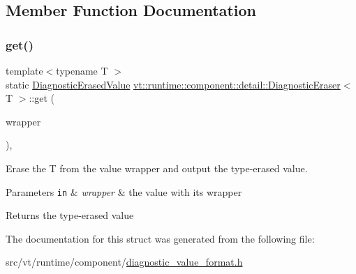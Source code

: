 \subsection{Member Function Documentation}
\mbox{\label{structvt_1_1runtime_1_1component_1_1detail_1_1_diagnostic_eraser_af09e0632083615511f10dd65b06e4781}} 
\subsubsection{\texorpdfstring{get()}{get()}}
{\footnotesize\ttfamily template$<$typename T $>$ \\
static \hyperlink{structvt_1_1runtime_1_1component_1_1_diagnostic_erased_value}{Diagnostic\+Erased\+Value} \hyperlink{structvt_1_1runtime_1_1component_1_1detail_1_1_diagnostic_eraser}{vt\+::runtime\+::component\+::detail\+::\+Diagnostic\+Eraser}$<$ T $>$\+::get (\begin{DoxyParamCaption}\item[{\hyperlink{structvt_1_1runtime_1_1component_1_1detail_1_1_diagnostic_value_wrapper}{Diagnostic\+Value\+Wrapper}$<$ T $>$}]{wrapper }\end{DoxyParamCaption})\hspace{0.3cm}{\ttfamily [inline]}, {\ttfamily [static]}}



Erase the {\ttfamily T} from the value wrapper and output the type-\/erased value. 


\begin{DoxyParams}[1]{Parameters}
\mbox{\tt in}  & {\em wrapper} & the value with its wrapper\\
\hline
\end{DoxyParams}
\begin{DoxyReturn}{Returns}
the type-\/erased value 
\end{DoxyReturn}


The documentation for this struct was generated from the following file\+:\begin{DoxyCompactItemize}
\item 
src/vt/runtime/component/\hyperlink{diagnostic__value__format_8h}{diagnostic\+\_\+value\+\_\+format.\+h}\end{DoxyCompactItemize}
